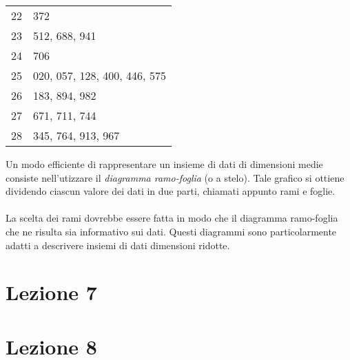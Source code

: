 \documentclass{article}
\begin{document}
\begin{minipage}[c]{0.35\textwidth}
    \centering
    \begin{tabular}{r|l}
        22 & 372 \\
        23 & 512, 688, 941 \\
        24 & 706 \\
        25 & 020, 057, 128, 400, 446, 575\\
        26 & 183, 894, 982 \\
        27 & 671, 711, 744 \\
        28 & 345, 764, 913, 967 \\
    \end{tabular}
\end{minipage}
\hspace{2mm}
\begin{minipage}[c]{0.6\textwidth}
    \vspace{-2mm}
    Un modo efficiente di rappresentare un insieme di dati di dimensioni medie consiste nell'utizzare il \textit{diagramma ramo-foglia} (o a stelo). Tale grafico si ottiene dividendo ciascun valore dei dati in due parti, chiamati appunto rami e foglie. \\ \\
    La scelta dei rami dovrebbe essere fatta in modo che il \mbox{diagramma} ramo-foglia che ne risulta sia informativo sui dati. Questi diagrammi sono particolarmente adatti a descrivere insiemi di dati dimensioni ridotte.
\end{minipage}

\hfill




\section*{Lezione 7}

\section*{Lezione 8}
\end{document}
